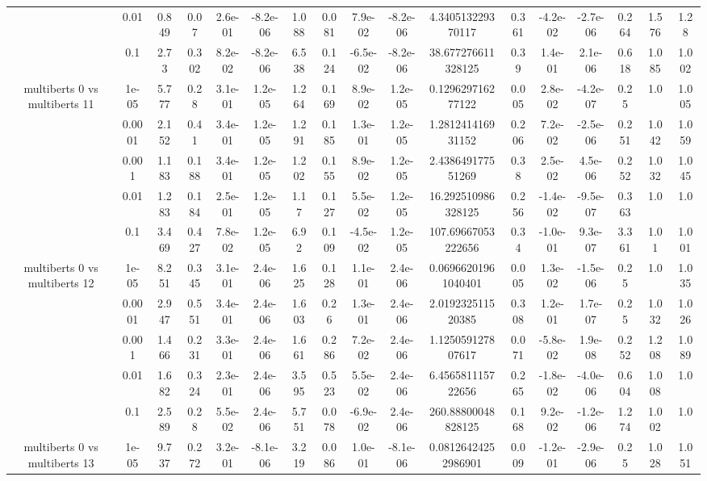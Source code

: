 \begin{tabular}{|c|c|c|c|c|c|c|c|c|c|c|c|c|c|c|c|c|}
 & 0.01 & 0.849 & 0.07 & 2.6e-01 & -8.2e-06 & 1.088 & 0.081 & 7.9e-02 & -8.2e-06 & 4.340513229370117 & 0.361 & -4.2e-02 & -2.7e-06 & 0.264 & 1.576 & 1.28 \\
 & 0.1 & 2.73 & 0.302 & 8.2e-02 & -8.2e-06 & 6.538 & 0.124 & -6.5e-02 & -8.2e-06 & 38.677276611328125 & 0.39 & 1.4e-01 & 2.1e-06 & 0.618 & 1.085 & 1.002 \\
\hline
\multirow{5}{*}{multiberts 0 vs multiberts 11} & 1e-05 & 5.777 & 0.28 & 3.1e-01 & 1.2e-05 & 1.264 & 0.169 & 8.9e-02 & 1.2e-05 & 0.129629716277122 & 0.005 & 2.8e-02 & -4.2e-07 & 0.25 & 1.0 & 1.005 \\
 & 0.0001 & 2.152 & 0.41 & 3.4e-01 & 1.2e-05 & 1.291 & 0.185 & 1.3e-01 & 1.2e-05 & 1.281241416931152 & 0.206 & 7.2e-02 & -2.5e-06 & 0.251 & 1.042 & 1.059 \\
 & 0.001 & 1.183 & 0.188 & 3.4e-01 & 1.2e-05 & 1.202 & 0.155 & 8.9e-02 & 1.2e-05 & 2.438649177551269 & 0.38 & 2.5e-02 & 4.5e-06 & 0.252 & 1.032 & 1.045 \\
 & 0.01 & 1.283 & 0.184 & 2.5e-01 & 1.2e-05 & 1.17 & 0.127 & 5.5e-02 & 1.2e-05 & 16.292510986328125 & 0.256 & -1.4e-02 & -9.5e-07 & 0.363 & 1.0 & 1.0 \\
 & 0.1 & 3.469 & 0.427 & 7.8e-02 & 1.2e-05 & 6.92 & 0.109 & -4.5e-02 & 1.2e-05 & 107.69667053222656 & 0.34 & -1.0e-01 & 9.3e-07 & 3.361 & 1.01 & 1.001 \\
\hline
\multirow{5}{*}{multiberts 0 vs multiberts 12} & 1e-05 & 8.251 & 0.345 & 3.1e-01 & 2.4e-06 & 1.625 & 0.128 & 1.1e-01 & 2.4e-06 & 0.06966201961040401 & 0.005 & 1.3e-02 & -1.5e-06 & 0.25 & 1.0 & 1.035 \\
 & 0.0001 & 2.947 & 0.551 & 3.4e-01 & 2.4e-06 & 1.603 & 0.26 & 1.3e-01 & 2.4e-06 & 2.019232511520385 & 0.308 & 1.2e-01 & 1.7e-07 & 0.25 & 1.032 & 1.026 \\
 & 0.001 & 1.466 & 0.231 & 3.3e-01 & 2.4e-06 & 1.661 & 0.286 & 7.2e-02 & 2.4e-06 & 1.125059127807617 & 0.071 & -5.8e-02 & 1.9e-08 & 0.252 & 1.208 & 1.089 \\
 & 0.01 & 1.682 & 0.324 & 2.3e-01 & 2.4e-06 & 3.595 & 0.523 & 5.5e-02 & 2.4e-06 & 6.456581115722656 & 0.265 & -1.8e-02 & -4.0e-06 & 0.604 & 1.008 & 1.0 \\
 & 0.1 & 2.589 & 0.28 & 5.5e-02 & 2.4e-06 & 5.751 & 0.078 & -6.9e-02 & 2.4e-06 & 260.88800048828125 & 0.168 & 9.2e-02 & -1.2e-06 & 1.274 & 1.002 & 1.0 \\
\hline
\multirow{5}{*}{multiberts 0 vs multiberts 13} & 1e-05 & 9.737 & 0.272 & 3.2e-01 & -8.1e-06 & 3.219 & 0.086 & 1.0e-01 & -8.1e-06 & 0.08126424252986901 & 0.009 & -1.2e-01 & -2.9e-06 & 0.25 & 1.028 & 1.051 \\

\end{tabular}

